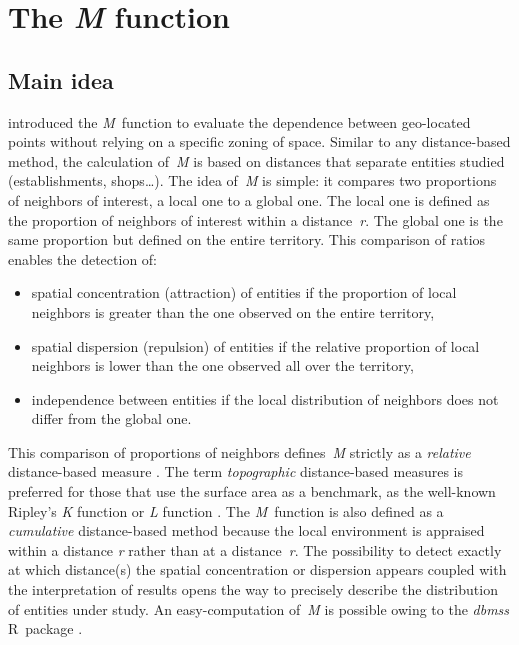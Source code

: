 \documentclass[fleqn,10pt]{latex/stylish_article} %
\providecommand{\tightlist}{%
  \setlength{\itemsep}{0pt}\setlength{\parskip}{0pt}}
\begin{document}
\section{\texorpdfstring{The \emph{M} function}{The M function}}\label{the-m-function}

\subsection{Main idea}\label{main-idea}

\citet{Marcon2010} introduced the \emph{M}~function to evaluate the dependence between geo-located points without relying on a specific zoning of space.
Similar to any distance-based method, the calculation of~\emph{M} is based on distances that separate entities studied (establishments, shops\ldots).
The idea of~\emph{M} is simple: it compares two proportions of neighbors of interest, a local one to a global one.
The local one is defined as the proportion of neighbors of interest within a distance~\emph{r}.
The global one is the same proportion but defined on the entire territory.
This comparison of ratios enables the detection of:

\begin{itemize}
\tightlist
\item
  spatial concentration (attraction) of entities if the proportion of local neighbors is greater than the one observed on the entire territory,
\item
  spatial dispersion (repulsion) of entities if the relative proportion of local neighbors is lower than the one observed all over the territory,
\item
  independence between entities if the local distribution of neighbors does not differ from the global one.
\end{itemize}

This comparison of proportions of neighbors defines~\emph{M} strictly as a \emph{relative} distance-based measure \citep{Marcon2017}.
The term \emph{topographic} distance-based measures is preferred for those that use the surface area as a benchmark, as the well-known Ripley's \emph{K} function or \emph{L} function \citep{Ripley1976, Ripley1977, Besag1977}.
The \emph{M}~function is also defined as a \emph{cumulative} distance-based method because the local environment is appraised within a distance \emph{r} rather than at a distance~\emph{r}.
The possibility to detect exactly at which distance(s) the spatial concentration or dispersion appears coupled with the interpretation of results opens the way to precisely describe the distribution of entities under study.
An easy-computation of~\emph{M} is possible owing to the \emph{dbmss} R~package \citep{Marcon2014}.
\end{document}
